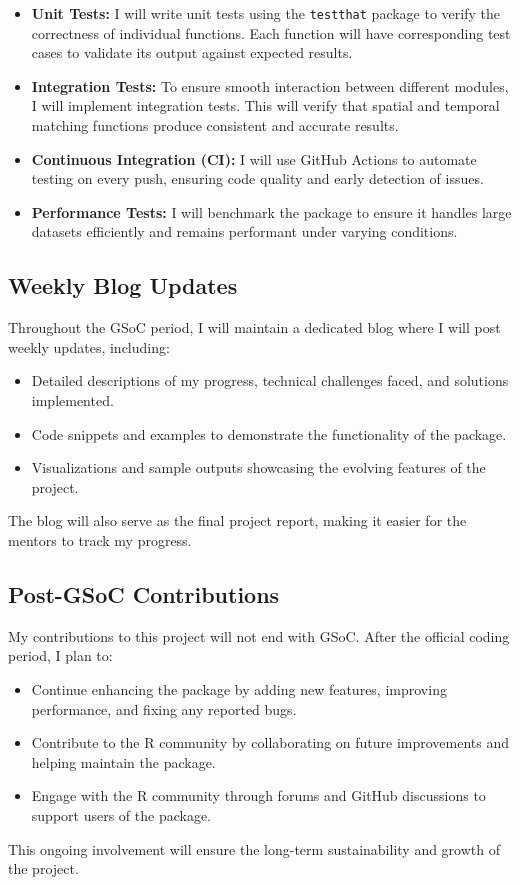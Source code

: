 \documentclass{article}
\newcommand{\code}[1]{\colorbox{customgray}{\texttt{#1}}}
\begin{document}
\begin{itemize}
    \item \textbf{Unit Tests:} I will write unit tests using the \code{testthat} package to verify the correctness of individual functions. Each function will have corresponding test cases to validate its output against expected results.
    \item \textbf{Integration Tests:} To ensure smooth interaction between different modules, I will implement integration tests. This will verify that spatial and temporal matching functions produce consistent and accurate results.
    \item \textbf{Continuous Integration (CI):} I will use GitHub Actions to automate testing on every push, ensuring code quality and early detection of issues.
    \item \textbf{Performance Tests:} I will benchmark the package to ensure it handles large datasets efficiently and remains performant under varying conditions.
\end{itemize}

\subsection{Weekly Blog Updates}
Throughout the GSoC period, I will maintain a dedicated blog where I will post weekly updates, including:
\begin{itemize}
    \item Detailed descriptions of my progress, technical challenges faced, and solutions implemented.
    \item Code snippets and examples to demonstrate the functionality of the package.
    \item Visualizations and sample outputs showcasing the evolving features of the project.
\end{itemize}
The blog will also serve as the final project report, making it easier for the mentors to track my progress.

\subsection{Post-GSoC Contributions}
My contributions to this project will not end with GSoC. After the official coding period, I plan to:
\begin{itemize}
    \item Continue enhancing the package by adding new features, improving performance, and fixing any reported bugs.
    \item Contribute to the R community by collaborating on future improvements and helping maintain the package.
    \item Engage with the R community through forums and GitHub discussions to support users of the package.
\end{itemize}
This ongoing involvement will ensure the long-term sustainability and growth of the project.
\end{document}
